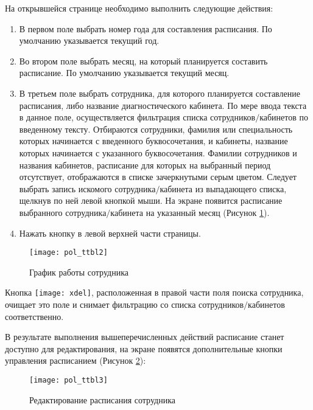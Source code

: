 {
На открывшейся странице необходимо выполнить следующие действия:
\begin{enumerate}
 \item В первом поле выбрать номер года для составления расписания. По умолчанию указывается текущий год.
 \item Во втором поле выбрать месяц, на который планируется составить расписание. По умолчанию указывается текущий месяц.
 \item В третьем поле выбрать сотрудника, для которого планируется составление расписания, либо название диагностического кабинета. По мере ввода текста в данное поле, осуществляется фильтрация списка сотрудников$\slash$кабинетов  по введенному тексту. Отбираются сотрудники, фамилия или специальность которых начинается с введенного буквосочетания, и кабинеты, название которых начинается с указанного буквосочетания. Фамилии сотрудников и названия кабинетов, расписание для которых на выбранный период отсутствует, отображаются в списке зачеркнутыми серым цветом. Следует выбрать запись искомого сотрудника$\slash$кабинета из выпадающего списка, щелкнув по ней левой кнопкой мыши. На экране появится расписание выбранного сотрудника$\slash$кабинета на указанный месяц (Рисунок \ref{img_pol_ttbl2}).   
 \item Нажать кнопку  в левой верхней части страницы. 
\end{enumerate}

\begin{figure}[ht]\centering
 \texttt{[image: pol\_ttbl2]}
 \caption{График работы сотрудника}
 \label{img_pol_ttbl2}
\end{figure}

\begin{prim}
 Кнопка \texttt{[image: xdel]}, расположенная в правой части поля поиска сотрудника, очищает это поле и снимает фильтрацию со списка сотрудников$\slash$кабинетов соответственно.
\end{prim}
 
В результате выполнения вышеперечисленных действий расписание станет доступно для редактирования, на экране появятся дополнительные кнопки управления расписанием (Рисунок \ref{img_pol_ttbl3}):

\begin{figure}[ht]\centering
 \texttt{[image: pol\_ttbl3]}
 \caption{Редактирование расписания сотрудника}
 \label{img_pol_ttbl3}
\end{figure}

}

